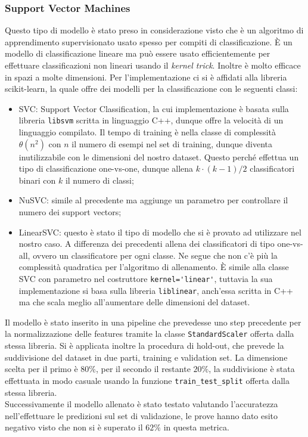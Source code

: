 \subsubsection{Support Vector Machines}
Questo tipo di modello è stato preso in considerazione visto che è un algoritmo di apprendimento supervisionato usato spesso per compiti di classificazione. È un modello di classificazione lineare ma può essere usato efficientemente per effettuare classificazioni non lineari usando il \textit{kernel trick}. Inoltre è molto efficace in spazi a molte dimensioni.
Per l'implementazione ci si è affidati alla libreria scikit-learn, la quale offre dei modelli per la classificazione con le seguenti classi:
\begin{itemize}
    \item SVC: Support Vector Classification, la cui implementazione è basata sulla libreria \verb|libsvm| scritta in linguaggio C++, dunque offre la velocità di un linguaggio compilato. Il tempo di training è nella classe di complessità $\theta (n^2)$ con $n$ il numero di esempi nel set di training, dunque diventa inutilizzabile con le dimensioni del nostro dataset. Questo perché effettua un tipo di classificazione one-vs-one, dunque allena $k \cdot (k-1)/2$ classificatori binari con $k$ il numero di classi;
    \item NuSVC: simile al precedente ma aggiunge un parametro per controllare il numero dei support vectors;
    \item LinearSVC: questo è stato il tipo di modello che si è provato ad utilizzare nel nostro caso. A differenza dei precedenti allena dei classificatori di tipo one-vs-all, ovvero un classificatore per ogni classe. Ne segue che non c'è più la complessità quadratica per l'algoritmo di allenamento. È simile alla classe SVC con parametro nel costruttore \verb|kernel='linear'|, tuttavia la sua implementazione si basa sulla libreria \verb|liblinear|, anch'essa scritta in C++ ma che scala meglio all'aumentare delle dimensioni del dataset.
\end{itemize}
Il modello è stato inserito in una pipeline che prevedesse uno step precedente per la normalizzazione delle features tramite la classe \verb|StandardScaler| offerta dalla stessa libreria. Si è applicata inoltre la procedura di hold-out, che prevede la suddivisione del dataset in due parti, training e validation set. La dimensione scelta per il primo è $80\%$, per il secondo il restante $20\%$, la suddivisione è stata effettuata in modo casuale usando la funzione \verb|train_test_split| offerta dalla stessa libreria.\\
Successivamente il modello allenato è stato testato valutando l'accuratezza nell'effettuare le predizioni sul set di validazione, le prove hanno dato esito negativo visto che non si è superato il $62\%$ in questa metrica.

